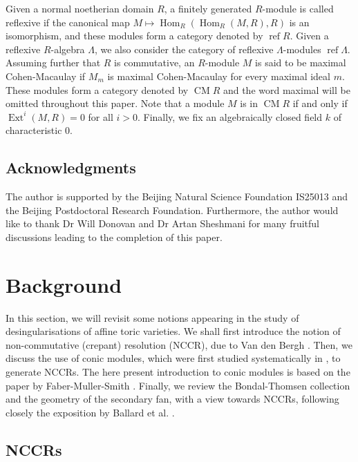 \documentclass[reqno, 12pt]{amsart}
\theoremstyle{definition}
\numberwithin{equation}{section}
\newcommand{\newterm}{\textsf}
\newcommand{\Hom}{\operatorname{Hom}}
\newcommand{\Ext}{\operatorname{Ext}}
\begin{document}
Given a normal noetherian domain $R$, a finitely generated $R$-module is called \newterm{reflexive} if the canonical map $M\mapsto \Hom_R(\Hom_R(M,R),R)$ is an isomorphism, and these modules form a category denoted by $\operatorname{ref}R$. Given a reflexive $R$-algebra $\Lambda$, we also consider the category of reflexive $\Lambda$-modules $\operatorname{ref}\Lambda$. Assuming further that $R$ is commutative, an $R$-module $M$ is said to be \newterm{maximal Cohen-Macaulay} if $M_m$ is maximal Cohen-Macaulay for every maximal ideal $m$. These modules form a category denoted by $\operatorname{CM}R$ and the word maximal will be omitted throughout this paper. Note that a module $M$ is in $\operatorname{CM}R$ if and only if $\Ext^i(M,R)=0$ for all $i>0$. Finally, we fix an algebraically closed field $k$ of characteristic 0. 

\subsection{Acknowledgments}
The author is supported by the Beijing Natural Science Foundation IS25013 and the Beijing Postdoctoral Research Foundation.
Furthermore, the author would like to thank Dr Will Donovan and Dr Artan Sheshmani for many fruitful discussions leading to the completion of this paper. 

\section{Background}\label{sec:Background}

In this section, we will revisit some notions appearing in the study of desingularisations of affine toric varieties. We shall first introduce the notion of \newterm{non-commutative (crepant) resolution (NCCR)}, due to Van den Bergh \cite{VdB04}. Then, we discuss the use of conic modules, which were first studied systematically in \cite{BG03}, to generate NCCRs. The here present introduction to conic modules is based on the paper by Faber-Muller-Smith \cite{FMS19}. Finally, we review the Bondal-Thomsen collection and the geometry of the secondary fan, with a view towards NCCRs, following closely the exposition by Ballard et al. \cite{BBB+}.
\subsection{NCCRs}
\end{document}
